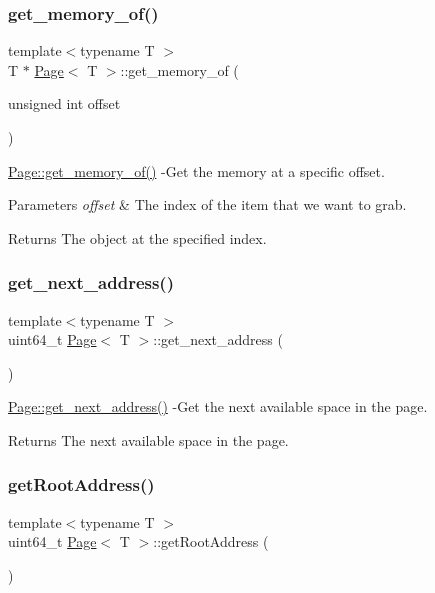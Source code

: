 \subsubsection{\texorpdfstring{get\+\_\+memory\+\_\+of()}{get\_memory\_of()}}
{\footnotesize\ttfamily template$<$typename T $>$ \\
T $\ast$ \hyperlink{class_page}{Page}$<$ T $>$\+::get\+\_\+memory\+\_\+of (\begin{DoxyParamCaption}\item[{unsigned int}]{offset }\end{DoxyParamCaption})}

\hyperlink{class_page_af540699e2f459eccb3a4991c0b509bce}{Page\+::get\+\_\+memory\+\_\+of()} -\/\+Get the memory at a specific offset. 
\begin{DoxyParams}{Parameters}
{\em offset} & The index of the item that we want to grab. \\
\hline
\end{DoxyParams}
\begin{DoxyReturn}{Returns}
The object at the specified index. 
\end{DoxyReturn}
\mbox{\label{class_page_ae6ac153d53ddb0493a4fff270dfa42cb}} 
\subsubsection{\texorpdfstring{get\+\_\+next\+\_\+address()}{get\_next\_address()}}
{\footnotesize\ttfamily template$<$typename T $>$ \\
uint64\+\_\+t \hyperlink{class_page}{Page}$<$ T $>$\+::get\+\_\+next\+\_\+address (\begin{DoxyParamCaption}{ }\end{DoxyParamCaption})}

\hyperlink{class_page_ae6ac153d53ddb0493a4fff270dfa42cb}{Page\+::get\+\_\+next\+\_\+address()} -\/\+Get the next available space in the page. \begin{DoxyReturn}{Returns}
The next available space in the page. 
\end{DoxyReturn}
\mbox{\label{class_page_a438a928e0ce67dc404f183678eb533ec}} 
\subsubsection{\texorpdfstring{get\+Root\+Address()}{getRootAddress()}}
{\footnotesize\ttfamily template$<$typename T $>$ \\
uint64\+\_\+t \hyperlink{class_page}{Page}$<$ T $>$\+::get\+Root\+Address (\begin{DoxyParamCaption}{ }\end{DoxyParamCaption})}

